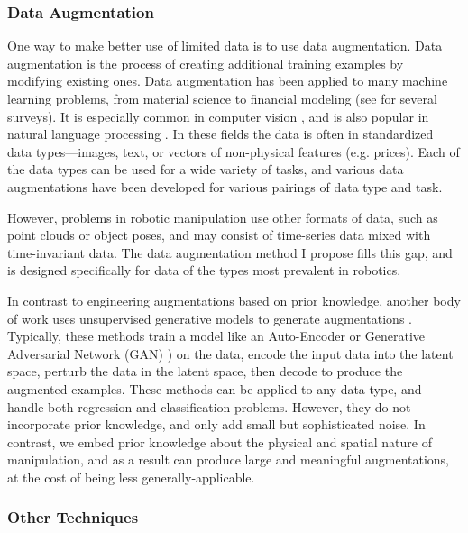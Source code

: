 \subsubsection{Data Augmentation}

One way to make better use of limited data is to use data augmentation. Data augmentation is the process of creating additional training examples by modifying existing ones. Data augmentation has been applied to many machine learning problems, from material science \cite{MaterialsAEOhno2020} to financial modeling \cite{PriceForecastingAE2021} (see \cite{TimeSeriesSurveyIwana2020,NLPSurveyFeng2021,ImageAugSurvey2019} for several surveys). It is especially common in computer vision \cite{ImageAugSurvey2019,BestPractice2003,AutoAugment,RLAugLaskin2020,Augerino2020}, and is also popular in natural language processing \cite{NLPSurveyFeng2021,NLPMa2019}. In these fields the data is often in standardized data types---images, text, or vectors of non-physical features (e.g. prices). Each of the data types can be used for a wide variety of tasks, and various data augmentations have been developed for various pairings of data type and task.

However, problems in robotic manipulation use other formats of data, such as point clouds or object poses, and may consist of time-series data mixed with time-invariant data. The data augmentation method I propose fills this gap, and is designed specifically for data of the types most prevalent in robotics.

In contrast to engineering augmentations based on prior knowledge, another body of work uses unsupervised generative models to generate augmentations \cite{BayesianDATran2017,MaterialsAEOhno2020,PriceForecastingAE2021}. Typically, these methods train a model like an Auto-Encoder or Generative Adversarial Network (GAN) \cite{GANGoodfellow14}) on the data, encode the input data into the latent space, perturb the data in the latent space, then decode to produce the augmented examples. These methods can be applied to any data type, and handle both regression and classification problems. However, they do not incorporate prior knowledge, and only add small but sophisticated noise. In contrast, we embed prior knowledge about the physical and spatial nature of manipulation, and as a result can produce large and meaningful augmentations, at the cost of being less generally-applicable.

\subsubsection{Other Techniques}

